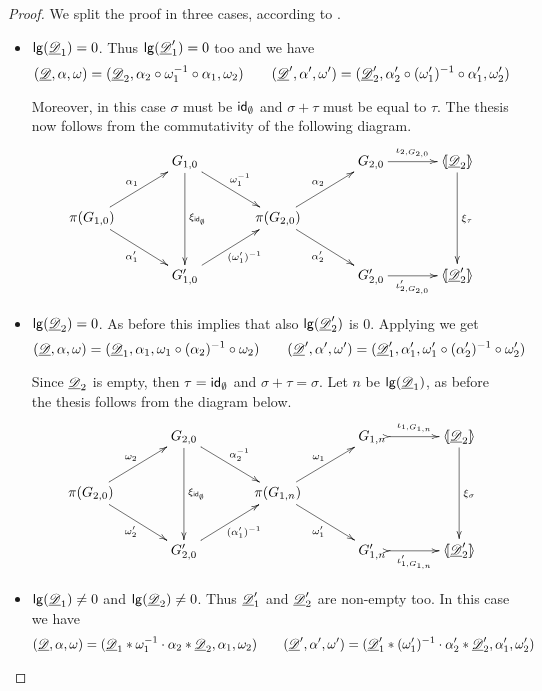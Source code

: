 \begin{proof}
We split the proof in three cases, according to .
	\begin{itemize}
	\item $\mathsf{lg}(\underline{\mathscr{D}}_1)=0$. Thus $\mathsf{lg}(\underline{\mathscr{D}}'_1)=0$ too  and we have
	\[
	(\underline{\mathscr{D}}, \alpha, \omega)=(\underline{\mathscr{D}}_2, \alpha_2\circ \omega_1^{-1}\circ \alpha_1, \omega_2) \qquad  (\underline{\mathscr{D}}', \alpha', \omega')=(\underline{\mathscr{D}}'_2, \alpha'_2\circ (\omega'_1)^{-1}\circ \alpha'_1, \omega'_2)\]

	Moreover, in this case $\sigma$ must be $\mathsf{id}_{\emptyset}$ and $\sigma+\tau$ must be equal to $\tau$. The thesis now follows from the commutativity of the following diagram.
	\[\xymatrix@C=35pt{& G_{1,0}\ar[dd]^{\xi_{\id{\emptyset}}} \ar[dr]^{\omega^{-1}_1}&&G_{2,0}\ar[r]^-{\iota_{2, G_{2,0}}} & \lpro \der{D}_2\rpro \ar[dd]^{\xi_{\tau}}\\\pi(G_{1,0})  \ar[ur]^{\alpha_1} \ar[dr]_{\alpha'_1}&& \pi(G_{2,0}) \ar[ur]^{\alpha_2} \ar[dr]_{\alpha'_2}\\& G'_{1,0} \ar[ur]_{(\omega'_1)^{-1}}&&G'_{2,0} \ar[r]_-{\iota'_{2, G_{2,0}}}& \lpro \der{D}'_2\rpro}\]
	
\item $\mathsf{lg}(\underline{\mathscr{D}}_2)=0$.  As before this implies that also $\mathsf{lg}(\underline{\mathscr{D}}'_2)$ is $0$.  Applying  we get 
\[
(\underline{\mathscr{D}}, \alpha, \omega)=(\underline{\mathscr{D}}_1, \alpha_1, \omega_1 \circ (\alpha_2)^{-1}\circ \omega_2) \qquad (\underline{\mathscr{D}}', \alpha', \omega')=(\underline{\mathscr{D}}'_1, \alpha'_1, \omega'_1 \circ (\alpha'_2)^{-1}\circ \omega'_2)\]
	
	Since $\underline{\mathscr{D}}_2$ is empty, then $\tau=\mathsf{id}_{\emptyset}$ and $\sigma+\tau=\sigma$. Let $n$ be $\mathsf{lg}(\underline{\mathscr{D}}_1)$, as before the thesis follows from the diagram below.
	\[\xymatrix@C=35pt{& G_{2,0}\ar[dd]^{\xi_{\id{\emptyset}}} \ar[dr]^{\alpha^{-1}_2}&&G_{1,n}\ar@{>->}[r]^-{\iota_{1, G_{1,n}}} & \lpro \der{D}_2\rpro \ar[dd]^{\xi_{\sigma}}\\\pi(G_{2,0})  \ar[ur]^{\omega_2} \ar[dr]_{\omega'_2}&& \pi(G_{1,n}) \ar[ur]^{\omega_1} \ar[dr]_{\omega'_1}\\& G'_{2,0} \ar[ur]_{(\alpha'_1)^{-1}}&&G'_{1,n} \ar@{>->}[r]_-{\iota'_{1, G_{1,n}}}& \lpro \der{D}'_2\rpro}\]
	
\item  $\mathsf{lg}(\underline{\mathscr{D}}_1)\neq0$ and $\mathsf{lg}(\underline{\mathscr{D}}_2)\neq 0$. Thus $\underline{\mathscr{D}}'_1$ and $\underline{\mathscr{D}}'_2$ are non-empty too. In this case we have
\[	(\underline{\mathscr{D}}, \alpha, \omega)=(\underline{\mathscr{D}}_1*\omega_1^{-1}\cdot \alpha_2*\underline{\mathscr{D}}_2, \alpha_1, \omega_2)\qquad
(\underline{\mathscr{D}}', \alpha', \omega')=(\underline{\mathscr{D}}'_1*(\omega'_1)^{-1}\cdot \alpha'_2*\underline{\mathscr{D}}'_2, \alpha'_1, \omega'_2)\]


\end{itemize}
\end{proof}
